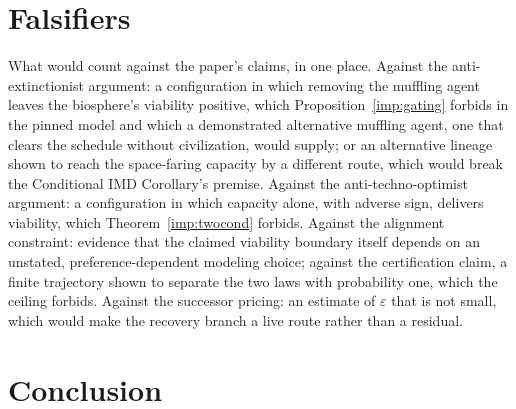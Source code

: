 \section{Falsifiers}\label{sec:falsifiers}

What would count against the paper's claims, in one place. Against the
anti-extinctionist argument: a configuration in which removing the
muffling agent leaves the biosphere's viability positive, which
Proposition~\ref{imp:gating} forbids in the pinned model and which a
demonstrated alternative muffling agent, one that clears the schedule
without civilization, would supply; or an alternative lineage shown to
reach the space-faring capacity by a different route, which would break
the Conditional IMD Corollary's premise. Against the anti-techno-optimist
argument: a configuration in which capacity alone, with adverse sign,
delivers viability, which Theorem~\ref{imp:twocond} forbids. Against
the alignment constraint: evidence that the claimed viability boundary
itself depends on an unstated, preference-dependent modeling choice;
against the certification claim, a finite trajectory shown to separate the two laws
with probability one, which the ceiling forbids. Against the successor
pricing: an estimate of $\varepsilon$ that is not small, which would
make the recovery branch a live route rather than a residual.

\section{Conclusion}\label{sec:conclusion}

